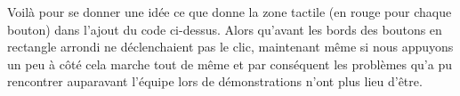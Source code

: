 Voilà pour se donner une idée ce que donne la zone tactile (en rouge pour chaque bouton) dans l'ajout du code ci-dessus. Alors qu'avant les bords des boutons en rectangle arrondi ne déclenchaient pas le clic, maintenant même si nous appuyons un peu à côté cela marche tout de même et par conséquent les problèmes qu'a pu rencontrer auparavant l'équipe lors de démonstrations n'ont plus lieu d'être.

\clearpage




